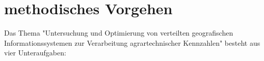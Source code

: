 \chapter{methodisches Vorgehen}



Das Thema "Untersuchung und Optimierung von verteilten geografischen Informationssystemen zur Verarbeitung agrartechnischer Kennzahlen" besteht aus vier Unteraufgaben:\\

